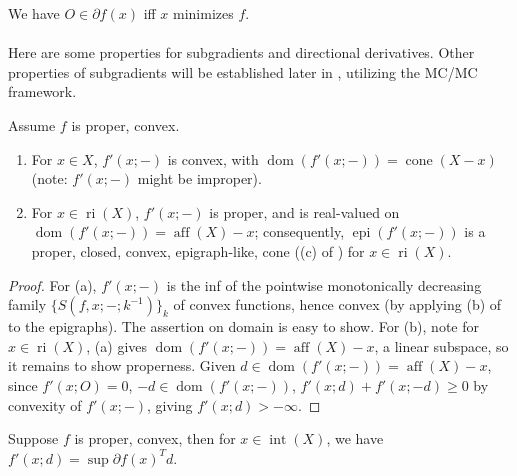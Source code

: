 \begin{exmp}[Optimality]
	We have $O\in \partial f(x)$ iff $x$ minimizes $f$.
\end{exmp}

\paragraph{}Here are some properties for subgradients and directional derivatives. Other properties of subgradients will be established later in , utilizing the MC/MC framework.

\begin{prop}\label{prop:022-properties-of-directional}
	Assume $f$ is proper, convex.
	\begin{enumerate}[label=(\alph*)]
		\item For $x\in X$, $f'(x;-)$ is convex, with $\operatorname{dom}(f'(x;-))=\operatorname{cone}(X-x)$ (note: $f'(x;-)$ might be improper).
		\item For $x\in \operatorname{ri}(X)$, $f'(x;-)$ is proper, and is real-valued on $\operatorname{dom}(f'(x;-))=\operatorname{aff}(X)-x$; consequently, $\operatorname{epi}(f'(x;-))$ is a proper, closed, convex, epigraph-like, cone ((c) of ) for $x\in \operatorname{ri}(X)$.
	\end{enumerate}
\end{prop}

\begin{proof}
	For (a), $f'(x;-)$ is the inf of the pointwise monotonically decreasing family $\{S(f,x;-; k^{-1})\}_{k}$ of convex functions, hence convex (by applying (b) of  to the epigraphs). The assertion on domain is easy to show. For (b), note for $x\in \operatorname{ri}(X)$, (a) gives $\operatorname{dom}(f'(x;-))=\operatorname{aff}(X)-x$, a linear subspace, so it remains to show properness. Given $d\in \operatorname{dom}(f'(x;-))=\operatorname{aff}(X)-x$, since $f'(x;O)=0$, $-d\in\operatorname{dom}(f'(x;-))$, $f'(x;d)+f'(x;-d)\geq 0$ by convexity of $f'(x;-)$, giving $f'(x;d)>-\infty$.
\end{proof}

\begin{coro}\label{coro:022-dir-sub-formula}
	Suppose $f$ is proper, convex, then for $x\in \operatorname{int}(X)$, we have $f'(x; d)=\sup \partial f(x)^T d$.
\end{coro}

